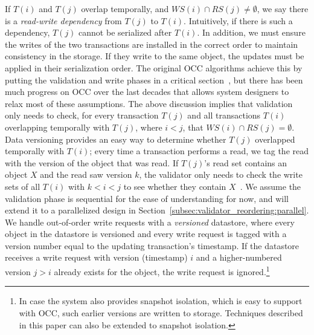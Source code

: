 If $T(i)$ and $T(j)$ overlap temporally, and $WS(i) \cap RS(j) \neq \emptyset$, we say there is a \emph{read-write dependency} from $T(j)$ to $T(i)$. Intuitively, if there is such a dependency, $T(j)$ cannot be serialized after $T(i)$. In addition, we must ensure the writes of the two transactions are installed in the correct order to maintain consistency in the storage. If they write to the same object, the updates must be applied in their serialization order. The original OCC algorithms achieve this by putting the validation and write phases in a critical section~\cite{kung81tods}, but there has been much progress on OCC over the last decades that allows system designers to relax most of these assumptions. 
The above discussion implies that validation only needs to check, for every transaction $T(j)$ and all transactions $T(i)$ overlapping temporally with $T(j)$, where $i<j$, that $WS(i) \cap RS(j) = \emptyset$. Data versioning provides an easy way to determine whether $T(j)$ overlapped temporally with $T(i)$; every time a transaction performs a read, we tag the read with the version of the object that was read. If $T(j)$'s read set contains an object $X$ and the read saw version $k$, the validator only needs to check the write sets of all $T(i)$ with $k < i < j$ to see whether they contain $X$~\cite{ding2015centiman}.
We assume the validation phase is sequential for the ease of understanding for now, and will extend it to a  parallelized design in Section~\ref{subsec:validator_reordering:parallel}. We handle out-of-order write requests with a \emph{versioned} datastore, where every object in the datastore is versioned and every write request is tagged with a version number equal to the updating transaction's timestamp. If the datastore receives a write request with version (timestamp) $i$ and a higher-numbered version $j > i$ already exists for the object, the write request is ignored.\footnote{In case the system also provides snapshot isolation, which is easy to support with OCC, such earlier versions are written to storage. Techniques described in this paper can also be extended to snapshot isolation.} 

